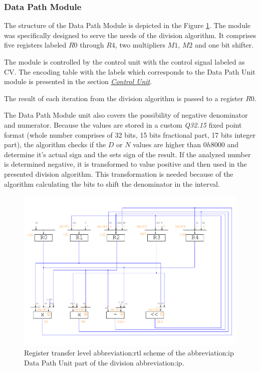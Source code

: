 \documentclass[a4paper, twoside, 11pt]{article}
\begin{document}
\subsubsection{Data Path Module}
The structure of the Data Path Module is depicted in the Figure \ref{fig:division-rtl}. The module was specifically designed to serve the needs of the division algorithm. It comprises five registers labeled $R0$ through $R4$, two multipliers $M1$, $M2$ and one bit shifter.\par
The module is controlled by the control unit with the control signal labeled as CV. The encoding table with the labels which corresponds to the Data Path Unit module is presented in the section \hyperref[subsubsec:division-control-unit]{\textit{Control Unit}}.\par
The result of each iteration from the division algorithm is passed to a register $R0$.\par
The Data Path Module unit also covers the possibility of negative denominator and numerator. Because the values are stored in a custom \textit{Q32.15} fixed point format (whole number comprises of 32 bits, 15 bits fractional part, 17 bits integer part), the algorithm checks if the $D$ or $N$ values are higher than $0h8000$ and determine it's actual sign and the sets sign of the result. If the analyzed number is determined negative, it is transformed to value positive and then used in the presented division algorithm. This transformation is needed because of the algorithm calculating the bits to shift the denominator in the interval.
\begin{figure}[htbp!]
  \centering
  \includegraphics[width=1\textwidth]{src/pdf/rtl.pdf}
   \caption{Register transfer level \gls{abbreviation:rtl} scheme of the \gls{abbreviation:ip} Data Path Unit part of the division \gls{abbreviation:ip}.}
  \label{fig:division-rtl}
\end{figure}
\end{document}

